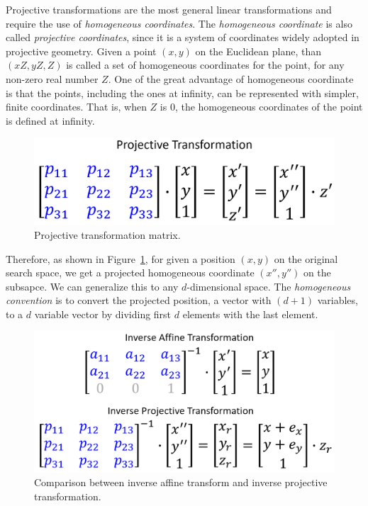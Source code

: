 Projective transformations are the most general linear transformations and require the use of \textit{homogeneous coordinates}.
The \textit{homogeneous coordinate} is also called \textit{projective coordinates}, 
since it is a system of coordinates widely adopted in projective geometry.
Given a point $(x,y)$ on the Euclidean plane, 
than $(xZ, yZ, Z)$ is called a set of homogeneous coordinates for the point, for any non-zero real number $Z$.
One of the great advantage of homogeneous coordinate is that the points, 
including the ones at infinity, can be represented with simpler, finite coordinates.
That is, when $Z$ is $0$, the homogeneous coordinates of the point is defined at infinity.

\begin{figure}
\centering
\includegraphics[width=\textwidth]{Projective_matrix}
\caption{Projective transformation matrix.}\label{fig:Projective_matrix}
\end{figure} 

Therefore, as shown in Figure~\ref{fig:Projective_matrix},
for given a position $(x,y)$ on the original search space, 
we get a projected homogeneous coordinate $(x'', y'')$ on the subsapce.  
We can generalize this to any $d$-dimensional space.
The \textit{homogeneous convention} is to convert the projected position, a vector with $(d+1)$ variables, to a $d$ variable vector 
by dividing first $d$ elements with the last element.

\begin{figure}
\centering
\includegraphics[width=\textwidth]{Inverse_transform}
\caption{Comparison between inverse affine transform and inverse projective transformation.}\label{fig:Inverse_transform}
\end{figure} 

